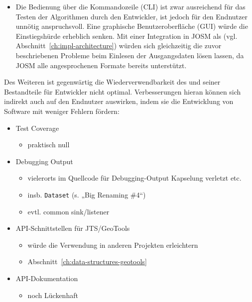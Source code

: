 \documentclass[../main/thesis.tex]{subfiles}
\begin{document}
\begin{itemize}
\item
Die Bedienung über die Kommandozeile (CLI) ist zwar ausreichend für das Testen der Algorithmen durch den Entwickler, ist jedoch für den Endnutzer unnötig anspruchsvoll.
Eine graphische Benutzeroberfläche (GUI) würde die Einstiegshürde erheblich senken.
Mit einer Integration in JOSM als  (vgl. Abschnitt~\ref{ch:impl-architecture}) würden sich gleichzeitig die zuvor beschriebenen Probleme beim Einlesen der Ausgangsdaten lösen lassen, da JOSM alle angesprochenen Formate bereits unterstützt.

\end{itemize}

Des Weiteren ist gegenwärtig die Wiederverwendbarkeit des  und seiner Bestandteile für Entwickler nicht optimal.
Verbesserungen hieran können sich indirekt auch auf den Endnutzer auswirken, indem sie die Entwicklung von Software mit weniger Fehlern fördern:
%
\begin{itemize}


\item Test Coverage
\begin{itemize}[nosep]
\item
praktisch null
\end{itemize}

\item Debugging Output
\begin{itemize}[nosep]
\item
vielerorts im Quellcode für Debugging-Output Kapselung verletzt etc.
\item
insb. \texttt{Dataset}  (s. „Big Renaming \#4“)
\item
evtl. common sink/listener
\end{itemize}

\item API-Schnittstellen für JTS/GeoTools
\begin{itemize}[nosep]
\item würde die Verwendung in anderen Projekten erleichtern
\item Abschnitt~\ref{ch:data-structures-geotools}
\end{itemize}

\item API-Dokumentation
\begin{itemize}[nosep]
\item noch Lückenhaft
\end{itemize}

\end{itemize}
\end{document}
